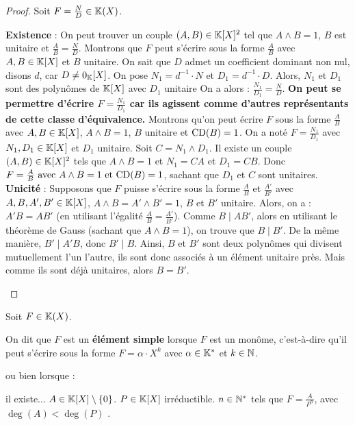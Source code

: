 \documentclass[12pt, a4paper]{report}
\begin{document}
\begin{proof}
    Soit $F = \frac ND \in \mathbb{K}(X)$.

    \begin{outline}
        \1 \textbf{Existence} : On peut trouver un couple $(A, B) \in \mathbb{K}[X]^2$ tel que $A \wedge B = 1$, $B$ est unitaire et $\frac AB = \frac ND$.
        \2 Montrons que $F$ peut s'écrire sous la forme $\frac AB$ avec $A, B \in \mathbb{K}[X]$ et $B$ unitaire.
        \3 On sait que $D$ admet un coefficient dominant non nul, disons $d$, car $D \neq 0_{\mathbb{K}}[X]$.
        \3 On pose $N_1 = d^{-1} \cdot N$ et $D_1 = d^{-1} \cdot D$. Alors, $N_1$ et $D_1$ sont des polynômes de $\mathbb{K}[X]$ avec $D_1$ unitaire
        \2 On a alors : $\frac{N_1}{D_1} = \frac ND$.
        \2 \textbf{On peut se permettre d'écrire $F = \frac{N_1}{D_1}$ car ils agissent comme d'autres représentants de cette classe d'équivalence.}
        \1 Montrons qu'on peut écrire $F$ sous la forme $\frac AB$ avec $A, B \in \mathbb{K}[X]$, $A \wedge B = 1$, $B$ unitaire et $\mathrm{CD}(B) = 1$.
        \2 On a noté $F = \frac{N_1}{D_1}$ avec $N_1, D_1 \in \mathbb{K}[X]$ et $D_1$ unitaire.
        \2 Soit $C = N_1 \wedge D_1$.
        \2 Il existe un couple $(A,B) \in \mathbb{K}[X]^2$ tels que $A \wedge B = 1$ et $N_1 = CA$ et $D_1 = CB$.
        \2 Donc $F = \frac AB \text{ avec } A \wedge B = 1 \text{ et } \mathrm{CD}(B) = 1$, sachant que $D_1$ et $C$ sont unitaires.
        \1 \textbf{Unicité} : Supposons que $F$ puisse s'écrire sous la forme $\frac AB$ et $\frac{A'}{B'}$ avec $A, B, A', B' \in \mathbb{K}[X]$, $A \wedge B = A' \wedge B' = 1$, $B$ et $B'$ unitaire. Alors, on a :
        \2 $A'B = AB'$ (en utilisant l'égalité $\frac AB = \frac{A'}{B'}$).
        \2 Comme $B \mid A B'$, alors en utilisant le théorème de Gauss (sachant que $A \wedge B = 1$), on trouve que $B \mid B'$. De la même manière, $B' \mid A' B$, donc $B' \mid B$.
        \2 Ainsi, $B$ et $B'$ sont deux polynômes qui divisent mutuellement l'un l'autre, ils sont donc associés à un élément unitaire près. Mais comme ils sont déjà unitaires, alors $B = B'$.
    \end{outline}
\end{proof}

\begin{definition}
    Soit $F \in \mathbb{K}(X)$.

    On dit que $F$ est un \textbf{élément simple} lorsque $F$ est un monôme, c'est-à-dire qu'il peut s'écrire sous la forme $F = \alpha \cdot X^k$ avec $\alpha \in \mathbb{K}^*$ et $k \in \mathbb{N}$.

    ou bien lorsque :
    \begin{outline}
        \1 il existe...
        \2 $A \in \mathbb{K}[X] \setminus \{0\}$.
        \2 $P \in \mathbb{K}[X]$ irréductible.
        \2 $n \in \mathbb{N}^*$
        \1 tels que $F = \frac{A}{P^n}$, avec $\deg(A) < \deg(P)$ .
    \end{outline}
\end{definition}
\end{document}

